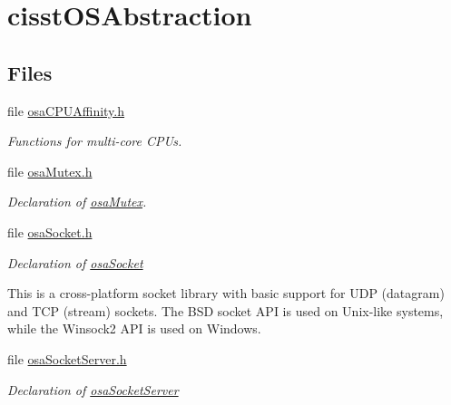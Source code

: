 \hypertarget{group__cisst_o_s_abstraction}{\section{cisst\-O\-S\-Abstraction}
\label{group__cisst_o_s_abstraction}
}
\subsection*{Files}
\begin{DoxyCompactItemize}
\item 
file \hyperlink{osa_c_p_u_affinity_8h}{osa\-C\-P\-U\-Affinity.\-h}
\begin{DoxyCompactList}\small\item\em Functions for multi-\/core C\-P\-Us. \end{DoxyCompactList}\item 
file \hyperlink{osa_mutex_8h}{osa\-Mutex.\-h}
\begin{DoxyCompactList}\small\item\em Declaration of \hyperlink{classosa_mutex}{osa\-Mutex}. \end{DoxyCompactList}\item 
file \hyperlink{osa_socket_8h}{osa\-Socket.\-h}
\begin{DoxyCompactList}\small\item\em Declaration of \hyperlink{classosa_socket}{osa\-Socket}

This is a cross-\/platform socket library with basic support for U\-D\-P (datagram) and T\-C\-P (stream) sockets. The B\-S\-D socket A\-P\-I is used on Unix-\/like systems, while the Winsock2 A\-P\-I is used on Windows. \end{DoxyCompactList}\item 
file \hyperlink{osa_socket_server_8h}{osa\-Socket\-Server.\-h}
\begin{DoxyCompactList}\small\item\em Declaration of \hyperlink{classosa_socket_server}{osa\-Socket\-Server}


\end{DoxyCompactList}
\end{DoxyCompactItemize}
